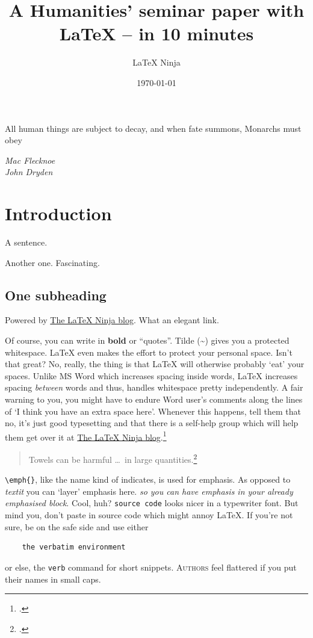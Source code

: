 \documentclass[10pt,a4paper]{article}
\title{A Humanities' seminar paper with \LaTeX{} -- in 10 minutes}
\author{\LaTeX{} Ninja}
\date{\today}
\newcommand{\dotdot}{ \lbrack\dots\rbrack~} %
\begin{document}
\maketitle
\tableofcontents
\epigraph{All human things are subject to decay, and when fate  summons, Monarchs must obey}{\textit{Mac Flecknoe \\ %
John Dryden}}
\section{Introduction}
A sentence.

Another one.
Fascinating.

\subsection{One subheading}
Powered by \href{https://latex-ninja.com}{The \LaTeX{} Ninja blog}. What an elegant link. 

Of course, you can write in \textbf{bold} or ``quotes''.
Tilde (\textasciitilde) gives you a protected whitespace. \LaTeX{} even makes the effort to protect your personal space. Isn't that great? No, really, the thing is that \LaTeX{} will otherwise probably `eat' your spaces. Unlike MS Word which increases spacing inside words, \LaTeX{} increases spacing \emph{between} words and thus, handles whitespace pretty independently. A fair warning to you, you might have to endure Word user's comments along the lines of `I think you have an extra space here'. Whenever this happens, tell them that no, it's just good typesetting and that there is a self-help group which will help them get over it at \href{https://latex-ninja.com}{The \LaTeX{} Ninja blog}.\footcite[cf.][33--44]{CiteKey} %

\begin{quote}\footnotesize
Towels can be harmful \dotdot in large quantities.\footcite[cf.][]{hitchhikersguide}
\end{quote}

\verb|\emph{}|, like the name kind of indicates, is used for emphasis. As opposed to \textit{textit} you can `layer' emphasis here.
\emph{so you can have \emph{emphasis} in your already emphasised block}. Cool, huh?
\texttt{source code} looks nicer in a typewriter font. But mind you, don't paste in source code which might annoy \LaTeX{}. If you're not sure, be on the safe side and use either
\begin{verbatim}
    the verbatim environment
\end{verbatim}
or else, the \verb|verb| command for short snippets.
\textsc{Authors} feel flattered if you put their names in small caps.
\end{document}
